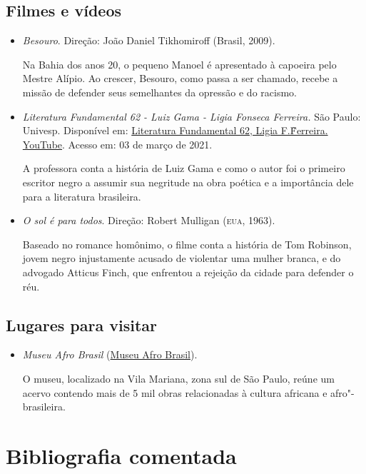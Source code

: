 \documentclass[12pt]{extarticle}
\begin{document}
\subsection{Filmes e vídeos}
\begin{itemize}
\item\textit{Besouro}. Direção: João Daniel Tikhomiroff (Brasil, 2009).

Na Bahia dos anos 20, o pequeno Manoel é apresentado à capoeira pelo
Mestre Alípio. Ao crescer, Besouro, como passa a ser chamado, recebe a
missão de defender seus semelhantes da opressão e do racismo.

\item\textit{Literatura Fundamental 62 - Luiz Gama - Ligia
Fonseca Ferreira.} São Paulo: Univesp. Disponível em:
\href{https://www.youtube.com/watch?v=WqSuNcU2jdA}{Literatura
Fundamental 62, Ligia F.\~Ferreira. YouTube}. Acesso
em: 03 de março de 2021.

A professora conta a história de Luiz Gama e como o autor foi o primeiro
escritor negro a assumir sua negritude na obra poética e a importância
dele para a literatura brasileira.

\item\textit{O sol é para todos}. Direção: Robert Mulligan (\textsc{eua}, 1963).

Baseado no romance homônimo, o filme conta a história de Tom Robinson,
jovem negro injustamente acusado de violentar uma mulher branca, e do
advogado Atticus Finch, que enfrentou a rejeição da cidade para defender
o réu.

\end{itemize}

\subsection{Lugares para visitar}

\begin{itemize}
\item\textit{Museu Afro Brasil}
(\href{http://www.museuafrobrasil.org.br/}{Museu Afro Brasil}).

O museu, localizado na Vila Mariana, zona sul de São Paulo, reúne um
acervo contendo mais de 5 mil obras relacionadas à cultura africana e
afro"-brasileira.
\end{itemize}


\section{Bibliografia comentada}
\end{document}
